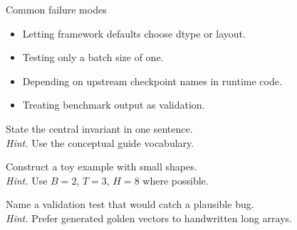 \begin{warningbox}{Common failure modes}
\begin{itemize}
\item Letting framework defaults choose dtype or layout.
\item Testing only a batch size of one.
\item Depending on upstream checkpoint names in runtime code.
\item Treating benchmark output as validation.
\end{itemize}
\end{warningbox}

\begin{chapterexercises}
\item State the central invariant in one sentence.\\
\textit{Hint.} Use the conceptual guide vocabulary.
\item Construct a toy example with small shapes.\\
\textit{Hint.} Use $B=2$, $T=3$, $H=8$ where possible.
\item Name a validation test that would catch a plausible bug.\\
\textit{Hint.} Prefer generated golden vectors to handwritten long arrays.
\end{chapterexercises}
